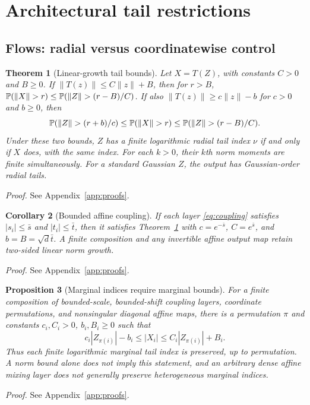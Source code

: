 \documentclass[11pt]{article}
\newtheorem{theorem}{Theorem}[section]
\newtheorem{proposition}[theorem]{Proposition}
\newtheorem{corollary}[theorem]{Corollary}
\theoremstyle{definition}\newtheorem{definition}[theorem]{Definition}
\theoremstyle{remark}\newtheorem{remark}[theorem]{Remark}
\begin{document}
\section{Architectural tail restrictions}\label{sec:architecture}
\subsection{Flows: radial versus coordinatewise control}
\begin{theorem}[Linear-growth tail bounds]\label{thm:growth}
Let $X=T(Z)$, with constants $C>0$ and $B\ge0$. If $\|T(z)\|\le C\|z\|+B$, then for $r>B$,
$\Prob(\|X\|>r)\le\Prob(\|Z\|>(r-B)/C)$.
If also $\|T(z)\|\ge c\|z\|-b$ for $c>0$ and $b\ge0$, then
\begin{equation}\label{eq:sandwich}
\Prob(\|Z\|>(r+b)/c)\le\Prob(\|X\|>r)
\le\Prob(\|Z\|>(r-B)/C).
\end{equation}
Under these two bounds, $Z$ has a finite logarithmic radial tail index $\nu$ if and only if $X$ does, with the same index. For each $k>0$, their $k$th norm moments are finite simultaneously. For a standard Gaussian $Z$, the output has Gaussian-order radial tails.
\end{theorem}
\noindent\emph{Proof.} See Appendix~\ref{app:proofs}.

\begin{corollary}[Bounded affine coupling]\label{cor:coupling}
If each layer \eqref{eq:coupling} satisfies $|s_i|\le\bar s$ and $|t_i|\le\bar t$, then it satisfies Theorem~\ref{thm:growth} with $c=e^{-\bar s}$, $C=e^{\bar s}$, and $b=B=\sqrt d\bar t$. A finite composition and any invertible affine output map retain two-sided linear norm growth.
\end{corollary}
\noindent\emph{Proof.} See Appendix~\ref{app:proofs}.

\begin{proposition}[Marginal indices require marginal bounds]\label{prop:marginal}
For a finite composition of bounded-scale, bounded-shift coupling layers, coordinate permutations, and nonsingular diagonal affine maps, there is a permutation $\pi$ and constants $c_i,C_i>0$, $b_i,B_i\ge0$ such that
\begin{equation}\label{eq:coordinate}
c_i|Z_{\pi(i)}|-b_i\le |X_i|\le C_i|Z_{\pi(i)}|+B_i.
\end{equation}
Thus each finite logarithmic marginal tail index is preserved, up to permutation. A norm bound alone does not imply this statement, and an arbitrary dense affine mixing layer does not generally preserve heterogeneous marginal indices.
\end{proposition}
\noindent\emph{Proof.} See Appendix~\ref{app:proofs}.
\end{document}
